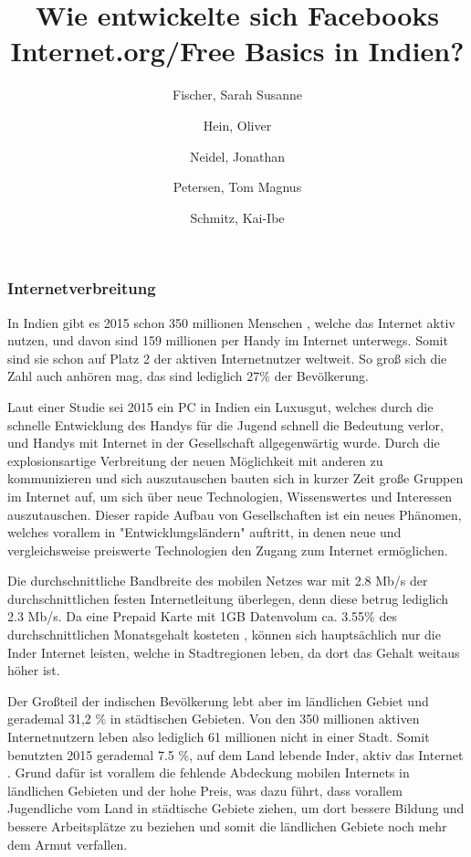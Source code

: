 \documentclass{article}
\title{Wie entwickelte sich Facebooks Internet.org/Free Basics in Indien?}
\author{
  Fischer, Sarah Susanne\\
  \and
  Hein, Oliver\\
  \and
  Neidel, Jonathan\\
  \and
  Petersen, Tom Magnus\\
  \and
  Schmitz, Kai-Ibe\\
}
\begin{document}
\maketitle
\subsubsection{Internetverbreitung}

In Indien gibt es 2015 schon 350 millionen Menschen\autocite{slideshareIndia} , welche das Internet aktiv nutzen, und davon sind 159 millionen per Handy im Internet unterwegs. Somit sind sie schon auf Platz 2 der aktiven Internetnutzer weltweit. So groß sich die Zahl auch anhören mag, das sind lediglich 27\% der Bevölkerung\autocite{InternetCountry}. 

Laut einer Studie sei 2015 ein PC in Indien ein Luxusgut, welches durch die schnelle Entwicklung des Handys für die Jugend schnell die Bedeutung verlor, und Handys mit Internet in der Gesellschaft allgegenwärtig wurde. Durch die explosionsartige Verbreitung der neuen Möglichkeit mit anderen zu kommunizieren und sich auszutauschen bauten sich in kurzer Zeit große Gruppen im Internet auf, um sich über neue Technologien, Wissenswertes und Interessen auszutauschen. Dieser rapide Aufbau von Gesellschaften ist ein neues Phänomen, welches vorallem in "Entwicklungsländern" auftritt, in denen neue und vergleichsweise preiswerte Technologien den Zugang zum Internet ermöglichen.   \textcite{empowermentThroughFacebook}

\medskip
Die durchschnittliche Bandbreite des mobilen Netzes war mit 2.8 Mb/s der durchschnittlichen festen Internetleitung überlegen, denn diese betrug lediglich 2.3 Mb/s\autocite{slideshareIndia}.
Da eine Prepaid Karte mit 1GB Datenvolum ca. 3.55\% des durchschnittlichen Monatsgehalt kosteten \autocite{broadbandAgency}, können sich hauptsächlich nur die Inder Internet leisten, welche in Stadtregionen leben, da dort das Gehalt weitaus höher ist.

 Der Großteil der indischen Bevölkerung lebt aber im ländlichen Gebiet  und gerademal 31,2 \% \autocite{IndiaBevölkerung} in städtischen Gebieten. 
Von den 350 millionen aktiven Internetnutzern leben also lediglich 61 millionen nicht in einer Stadt. Somit benutzten 2015 gerademal 7.5 \%, auf dem Land lebende Inder, aktiv das Internet \autocite{slideshareIndia}.
Grund dafür ist vorallem die fehlende Abdeckung mobilen Internets in ländlichen Gebieten und der hohe Preis, was dazu führt, dass vorallem Jugendliche vom Land in städtische Gebiete ziehen, um dort bessere Bildung und bessere Arbeitsplätze zu beziehen und somit die ländlichen Gebiete noch mehr dem Armut verfallen. 


\end{document}
